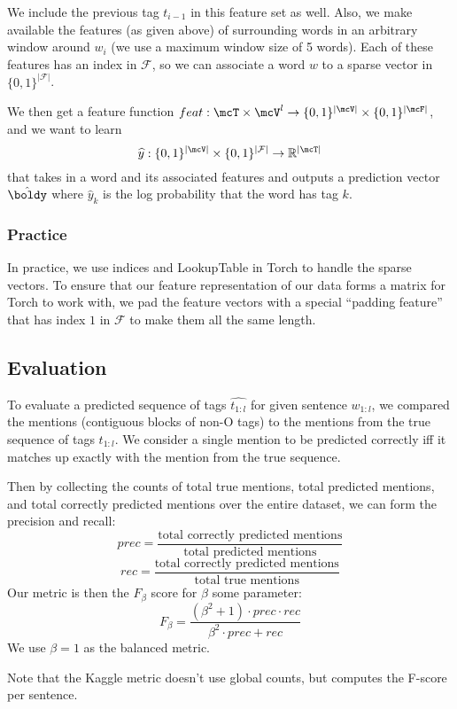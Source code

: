 \documentclass[11pt]{article}
\begin{document}
We include the previous tag $t_{i-1}$ in this feature set as well. Also, we make available the features (as given above) of surrounding words in an arbitrary window around $w_i$ (we use a maximum window size of 5 words). Each of these features has an index in $\mathcal{F}$, so we can associate a word $w$ to a sparse vector in $\{0,1\}^{|\mathcal{F}|}$.

We then get a feature function $feat : \mcT \times \mcV^l \to \{0,1\}^{|\mcV|} \times \{0, 1\}^{|\mcF|}$, and we want to learn
$$\widehat{y}: \{0,1\}^{|\mcV|} \times \{0,1\}^{|\mathcal{F}|} \to \mathbb{R}^{|\mcT|}$$
that takes in a word and its associated features and outputs a prediction vector $\hat{\boldy}$ where $\hat{y}_k$ is the log probability that the word has tag $k$. 

\subsubsection{Practice}

In practice, we use indices and LookupTable in Torch to handle the sparse vectors. To ensure that our feature representation of our data forms a matrix for Torch to work with, we pad the feature vectors with a special ``padding feature'' that has index $1$ in $\mathcal{F}$ to make them all the same length. 

\subsection{Evaluation}

To evaluate a predicted sequence of tags $\widehat{t_{1:l}}$ for given sentence $w_{1:l}$, we compared the mentions (contiguous blocks of non-O tags) to the mentions from the true sequence of tags $t_{1:l}$. We consider a single mention to be predicted correctly iff it matches up exactly with the mention from the true sequence.

Then by collecting the counts of total true mentions, total predicted mentions, and total correctly predicted mentions over the entire dataset, we can form the precision and recall:
$$prec = \frac{\text{total correctly predicted mentions}}{\text{total predicted mentions}}$$
$$rec = \frac{\text{total correctly predicted mentions}}{\text{total true mentions}}$$
Our metric is then the $F_\beta$ score for $\beta$ some parameter:
$$F_\beta = \frac{(\beta^2 + 1) \cdot prec \cdot rec}{\beta^2 \cdot prec + rec}$$
We use $\beta = 1$ as the balanced metric. 

Note that the Kaggle metric doesn't use global counts, but computes the F-score per sentence.
\end{document}
